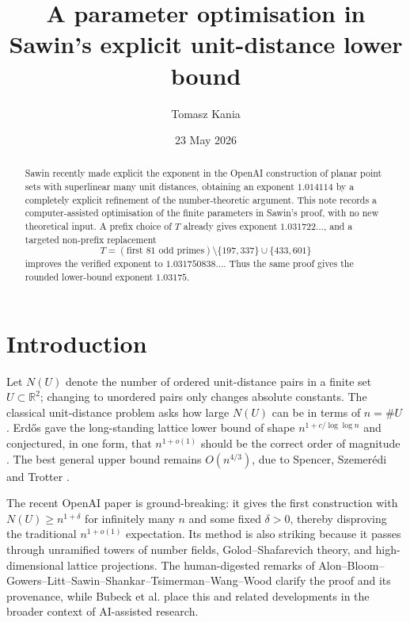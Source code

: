\documentclass[11pt]{amsart}
\title[A parameter optimisation in Sawin's unit-distance bound]{A parameter optimisation in Sawin's explicit unit-distance lower bound}
\author[T.~Kania]{Tomasz Kania}
\date{23 May 2026}
\newcommand{\RR}{\mathbb{R}}
\begin{document}
\begin{abstract}
  Sawin recently made explicit the exponent in the OpenAI construction of planar point sets with superlinear many unit distances, obtaining an exponent $1.014114$ by a completely explicit refinement of the number-theoretic argument.  This note records a computer-assisted optimisation of the finite parameters in Sawin's proof, with no new theoretical input.  A prefix choice of $T$ already gives exponent $1.031722\ldots$, and a targeted non-prefix replacement
  \[
    T=(\text{first }81\text{ odd primes})\setminus\{197,337\}\cup\{433,601\}
  \]
  improves the verified exponent to $1.031750838\ldots$.  Thus the same proof gives the rounded lower-bound exponent $1.03175$.
\end{abstract}

\maketitle

\section{Introduction}

Let $N(U)$ denote the number of ordered unit-distance pairs in a finite set $U \subset \RR^2$; changing to unordered pairs only changes absolute constants.  The classical unit-distance problem asks how large $N(U)$ can be in terms of $n=\#U$.  Erd\H{o}s gave the long-standing lattice lower bound of shape $n^{1+c/\log\log n}$ and conjectured, in one form, that $n^{1+o(1)}$ should be the correct order of magnitude \cite{Erdos1946,Erdos1982,Erdos1994}.  The best general upper bound remains $O(n^{4/3})$, due to Spencer, Szemer\'edi and Trotter \cite{SpencerSzemerediTrotter1984}.

The recent OpenAI paper \cite{OpenAIUnitDistances} is ground-breaking: it gives the first construction with $N(U) \geqslant n^{1+\delta}$ for infinitely many $n$ and some fixed $\delta>0$, thereby disproving the traditional $n^{1+o(1)}$ expectation.  Its method is also striking because it passes through unramified towers of number fields, Golod--Shafarevich theory, and high-dimensional lattice projections.  The human-digested remarks of Alon--Bloom--Gowers--Litt--Sawin--Shankar--Tsimerman--Wang--Wood \cite{UnitDistanceRemarks} clarify the proof and its provenance, while Bubeck et al. \cite{BubeckEtAlGPT5Science} place this and related developments in the broader context of AI-assisted research.
\end{document}
